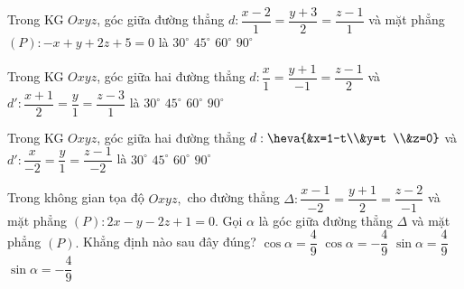 	\begin{ex}%
	Trong KG $Oxyz$, góc giữa đường thẳng $d:\dfrac{x-2}{1}=\dfrac{y+3}{2}=\dfrac{z-1}{1}$ và mặt phẳng $(P):-x+y+2z+5=0$ là
	\choice
	{$30^{\circ}$}
	{\True $45^{\circ}$}
	{$60^{\circ}$}
	{$90^{\circ}$}
	\end{ex}
	\begin{ex}%
	Trong KG $Oxyz$, góc giữa hai đường thẳng $d:\dfrac{x}{1}=\dfrac{y+1}{-1}=\dfrac{z-1}{2}$ và $d': \dfrac{x+1}{2}=\dfrac{y}{1}=\dfrac{z-3}{1}$ là 
	\choice
	{$30^{\circ}$}
	{$45^{\circ}$}
	{\True $60^{\circ}$}
	{$90^{\circ}$}
	\end{ex}
	\begin{ex}%
	Trong KG $Oxyz$, góc giữa hai đường thẳng $d:\heva{&x=1-t\\&y=t \\&z=0}$ và \break $d': \dfrac{x}{-2}=\dfrac{y}{1}=\dfrac{z-1}{-2}$ là 
	\choice
	{$30^{\circ}$}
	{\True $45^{\circ}$}
	{$60^{\circ}$}
	{$90^{\circ}$}
	\end{ex}
	\begin{ex}%
	Trong không gian tọa độ $Oxyz,$ cho đường thẳng $\Delta\colon \dfrac{x-1}{-2}=\dfrac{y+1}2=\dfrac{z-2}{-1}$ và mặt phẳng $(P)\colon 2x-y-2z+1=0.$ Gọi $\alpha$ là góc giữa đường thẳng $\Delta$ và mặt phẳng $(P).$ Khẳng định nào sau đây đúng?
	\choice
	{$\cos \alpha=\dfrac49$}
	{$\cos \alpha=-\dfrac49$}
	{\True $\sin \alpha=\dfrac49$}
	{$\sin \alpha=-\dfrac49$}
	\end{ex}
